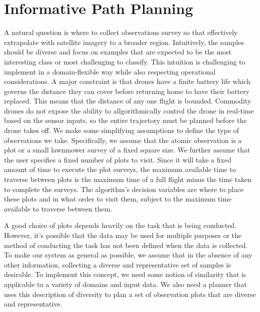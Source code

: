 \section{Informative Path Planning}
A natural question is where to collect observations survey so that effectively extrapolate with satellite imagery to a broader region. 
Intuitively, the samples should be diverse and focus on examples that are expected to be the most interesting class or most challenging to classify. This intuition is challenging to implement in a domain-flexible way while also respecting operational considerations.
A major constraint is that drones have a finite battery life which governs the distance they can cover before returning home to have their battery replaced. This means that the distance of any one flight is bounded. Commodity drones do not expose the ability to allgorithmically control the drone in real-time based on the sensor inputs, so the entire trajectory must be planned before the drone takes off.
We make some simplifying assumptions to define the type of observations we take. Specifically, we assume that the atomic observation is a plot or a small lawnmower survey of a fixed square size. We further assume that the user specifies a fixed number of plots to visit. Since it will take a fixed amount of time to execute the plot surveys, the maximum available time to traverse between plots is the maximum time of a full flight minus the time taken to complete the surveys. The algorithm's decision variables are where to place these plots and in what order to visit them, subject to the maximum time available to traverse between them.


A good choice of plots depends heavily on the task that is being conducted. However, it's possible that the data may be used for multiple purposes or the method of conducting the task has not been defined when the data is collected. To make our system as general as possible, we assume that in the absence of any other information, collecting a diverse and representative set of samples is desirable. To implement this concept, we need some notion of similarity that is applicable to a variety of domains and input data. We also need a planner that uses this description of diversity to plan a set of observation plots that are diverse and representative.


